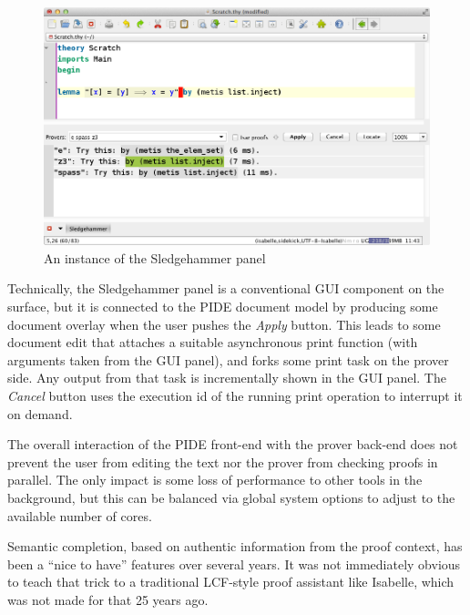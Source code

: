 \begin{isabellebody}
\begin{isamarkuptext}
\begin{figure}[htb]
\begin{center}
\includegraphics[scale=0.333]{sledgehammer}
\end{center}
\caption{An instance of the Sledgehammer panel}
\label{fig:sledgehammer}
\end{figure}

Technically, the Sledgehammer panel is a conventional GUI component on the
surface, but it is connected to the PIDE document model by producing some
document overlay when the user pushes the \emph{Apply} button. This leads to
some document edit that attaches a suitable asynchronous print function
(with arguments taken from the GUI panel), and forks some print task on the
prover side. Any output from that task is incrementally shown in the GUI
panel. The \emph{Cancel} button uses the execution id of the running print
operation to interrupt it on demand.

The overall interaction of the PIDE front-end with the prover back-end does
not prevent the user from editing the text nor the prover from checking
proofs in parallel. The only impact is some loss of performance to other
tools in the background, but this can be balanced via global system options
to adjust to the available number of cores.%
\end{isamarkuptext}%
\isamarkuptrue%
%
\isamarkuptrue%
%
\begin{isamarkuptext}%
Semantic completion, based on authentic information from the proof
context, has been a ``nice to have'' features over several years. It was not
immediately obvious to teach that trick to a traditional LCF-style proof
assistant like Isabelle, which was not made for that 25 years ago.


\end{isamarkuptext}
\end{isabellebody}
